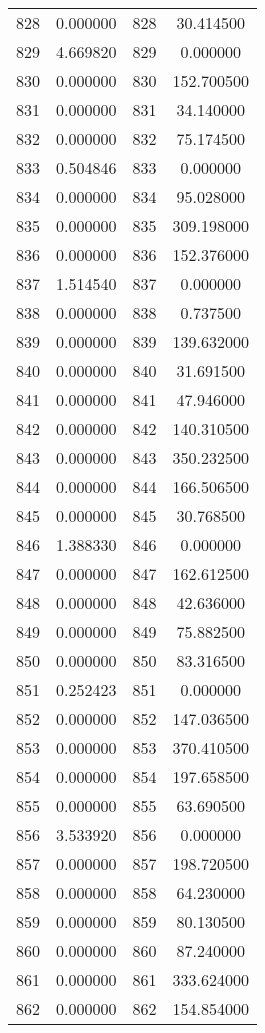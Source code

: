 \documentclass[12pt]{article}
\begin{document}
\begin{longtable}{@{}cccc@{}}
828 & 0.000000 & 828 & 30.414500 \\
829 & 4.669820 & 829 & 0.000000 \\
830 & 0.000000 & 830 & 152.700500 \\
831 & 0.000000 & 831 & 34.140000 \\
832 & 0.000000 & 832 & 75.174500 \\
833 & 0.504846 & 833 & 0.000000 \\
834 & 0.000000 & 834 & 95.028000 \\
835 & 0.000000 & 835 & 309.198000 \\
836 & 0.000000 & 836 & 152.376000 \\
837 & 1.514540 & 837 & 0.000000 \\
838 & 0.000000 & 838 & 0.737500 \\
839 & 0.000000 & 839 & 139.632000 \\
840 & 0.000000 & 840 & 31.691500 \\
841 & 0.000000 & 841 & 47.946000 \\
842 & 0.000000 & 842 & 140.310500 \\
843 & 0.000000 & 843 & 350.232500 \\
844 & 0.000000 & 844 & 166.506500 \\
845 & 0.000000 & 845 & 30.768500 \\
846 & 1.388330 & 846 & 0.000000 \\
847 & 0.000000 & 847 & 162.612500 \\
848 & 0.000000 & 848 & 42.636000 \\
849 & 0.000000 & 849 & 75.882500 \\
850 & 0.000000 & 850 & 83.316500 \\
851 & 0.252423 & 851 & 0.000000 \\
852 & 0.000000 & 852 & 147.036500 \\
853 & 0.000000 & 853 & 370.410500 \\
854 & 0.000000 & 854 & 197.658500 \\
855 & 0.000000 & 855 & 63.690500 \\
856 & 3.533920 & 856 & 0.000000 \\
857 & 0.000000 & 857 & 198.720500 \\
858 & 0.000000 & 858 & 64.230000 \\
859 & 0.000000 & 859 & 80.130500 \\
860 & 0.000000 & 860 & 87.240000 \\
861 & 0.000000 & 861 & 333.624000 \\
862 & 0.000000 & 862 & 154.854000 \\

\end{longtable}
\end{document}
